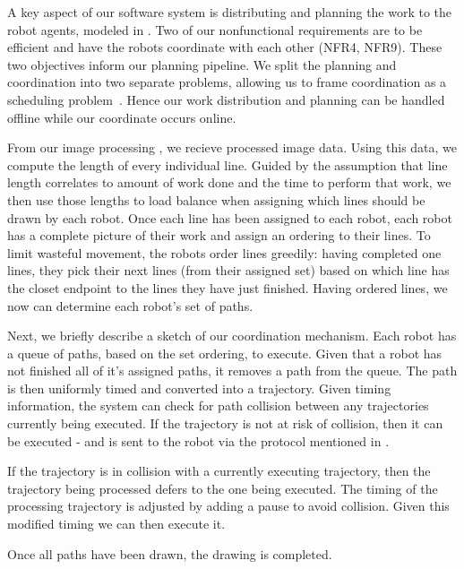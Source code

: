 A key aspect of our software system is distributing and planning the work to the robot agents, modeled in .
Two of our nonfunctional requirements are to be efficient and have the robots coordinate with each other (NFR4, NFR9). These two objectives inform our planning pipeline. We split the planning and coordination into two separate problems, allowing us to frame coordination as a scheduling problem~\cite{o1989deadlock}. Hence our work distribution and planning can be handled offline while our coordinate occurs online. 

From our image processing , we recieve processed image data. 
Using this data, we compute the length of every individual line. 
Guided by the assumption that line length correlates to amount of work done and the time to perform that work, we then use those lengths to load balance when assigning which lines should be drawn by each robot. 
Once each line has been assigned to each robot, each robot has a complete picture of their work and assign an ordering to their lines. 
To limit wasteful movement, the robots order lines greedily: having completed one lines, they pick their next lines (from their assigned set) based on which line has the closet endpoint to the lines they have just finished. 
Having ordered lines, we now can determine each robot's set of paths. 

Next, we briefly describe a sketch of our coordination mechanism. Each robot has a queue of paths, based on the set ordering, to execute.
Given that a robot has not finished all of it's assigned paths, it removes a path from the queue.
The path is then uniformly timed and converted into a trajectory.
Given timing information, the system can check for path collision between any trajectories currently being executed.
If the trajectory is not at risk of collision, then it can be executed - and is sent to the robot via the protocol mentioned in . 

If the trajectory is in collision with a currently executing trajectory, then the trajectory being processed defers to the one being executed. 
The timing of the processing trajectory is adjusted by adding a pause to avoid collision. Given this modified timing we can then execute it. 

Once all paths have been drawn, the drawing is completed.